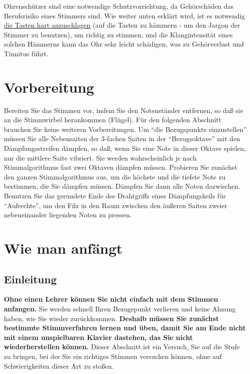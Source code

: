 Ohrenschützer sind eine notwendige Schutzvorrichtung, da Gehörschäden das Berufsrisiko eines Stimmers sind.
 Wie weiter unten erklärt wird, ist es notwendig \hyperlink{c2_5_infi}{die Tasten hart anzuschlagen} (auf die Tasten zu hämmern - um den Jargon der Stimmer zu benutzen), um richtig zu stimmen, und die Klangintensität eines solchen Hämmerns kann das Ohr sehr leicht schädigen, was zu Gehörverlust und Tinnitus führt.
 \hypertarget{c2_4}{}

\section{Vorbereitung}

Bereiten Sie das Stimmen vor, indem Sie den Notenständer entfernen, so daß sie an die Stimmwirbel herankommen (Flügel).
 Für den folgenden Abschnitt brauchen Sie keine weiteren Vorbereitungen.
 Um \enquote{die Bezugspunkte einzustellen} müssen Sie alle Nebensaiten der 3-fachen Saiten in der \enquote{Bezugsoktave} mit den Dämpfungsstreifen dämpfen, so daß, wenn Sie eine Note in dieser Oktave spielen, nur die mittlere Saite vibriert.
 Sie werden wahrscheinlich je nach Stimmalgorithmus fast zwei Oktaven dämpfen müssen.
 Probieren Sie zunächst den ganzen Stimmalgorithmus aus, um die höchste und die tiefste Note zu bestimmen, die Sie dämpfen müssen.
 Dämpfen Sie dann alle Noten dazwischen.
 Benutzen Sie das gerundete Ende des Drahtgriffs eines Dämpfungskeils für \enquote{Aufrechte}, um den Filz in den Raum zwischen den äußeren Saiten zweier nebeneinander liegenden Noten zu pressen.
 
\hypertarget{c2_5}{}

\section{Wie man anfängt}\hypertarget{c2_5a}{}

\subsection{Einleitung}

\textbf{Ohne einen Lehrer können Sie nicht einfach mit dem Stimmen anfangen.}
 Sie werden schnell Ihren Bezugspunkt verlieren und keine Ahnung haben, wie Sie wieder zurückkommen.
 {\normalsize \textbf{Deshalb müssen Sie zunächst bestimmte Stimmverfahren lernen und üben, damit Sie am Ende nicht mit einem unspielbaren Klavier dastehen, das Sie nicht wiederherstellen können.}}
 Dieser Abschnitt ist ein Versuch, Sie auf die Stufe zu bringen, bei der Sie ein richtiges Stimmen versuchen können, ohne auf Schwierigkeiten dieser Art zu stoßen.
 

